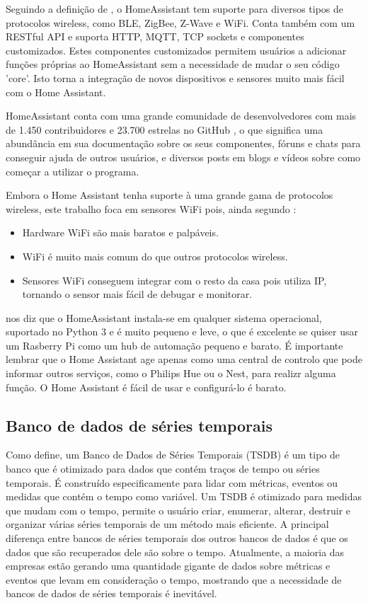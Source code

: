 Seguindo a definição de \cite{Gomes2018}, o HomeAssistant tem suporte para diversos tipos de protocolos wireless, como BLE, ZigBee, Z-Wave e WiFi. Conta também com um RESTful API e suporta HTTP, MQTT, TCP sockets e componentes customizados. Estes componentes customizados permitem usuários a adicionar funções próprias ao HomeAssistant sem a necessidade de mudar o seu código 'core'. Isto torna a integração de novos dispositivos e sensores muito mais fácil com o Home Assistant.


HomeAssistant conta com uma grande comunidade de desenvolvedores com mais de 1.450 contribuidores e 23.700 estrelas no GitHub \cite{githubhomeassistant}, o que significa uma abundância em sua documentação sobre os seus componentes, fóruns e chats para conseguir ajuda de outros usuários, e diversos posts em blogs e vídeos sobre como começar a utilizar o programa.

Embora o Home Assistant tenha suporte à uma grande gama de protocolos wireless, este trabalho foca em sensores WiFi pois, ainda segundo \cite{Lundrigan2017}:

\begin{itemize}
	\item Hardware WiFi são mais baratos e palpáveis.
	\item WiFi é muito mais comum do que outros protocolos wireless.
	\item Sensores WiFi conseguem integrar com o resto da casa pois utiliza IP, tornando o sensor mais fácil de debugar e monitorar.
\end{itemize}

\cite{AlmeidaCosta} nos diz que o HomeAssistant instala-se em qualquer sistema operacional, suportado no Python 3 e é muito pequeno e leve, o que é excelente se quiser usar um Rasberry Pi como um hub de automação pequeno e barato. É importante lembrar que o Home Assistant age apenas como uma central de controlo que pode informar outros serviços, como o Philips Hue ou o Nest, para realizr alguma função. O Home Assistant é fácil de usar e configurá-lo é barato.

\subsection{Banco de dados de séries temporais}

Como \cite{Noor2017} define, um Banco de Dados de Séries Temporais (TSDB) é um tipo de banco que é otimizado para dados que contém traços de tempo ou séries temporais. É construído especificamente para lidar com métricas, eventos ou medidas que contém o tempo como variável. Um TSDB é otimizado para medidas que mudam com o tempo, permite o usuário criar, enumerar, alterar, destruir e organizar várias séries temporais de um método mais eficiente. A principal diferença entre bancos de séries temporais dos outros bancos de dados é que os dados que são recuperados dele são sobre o tempo. Atualmente, a maioria das empresas estão gerando uma quantidade gigante de dados sobre métricas e eventos que levam em consideração o tempo, mostrando que a necessidade de bancos de dados de séries temporais é inevitável.

